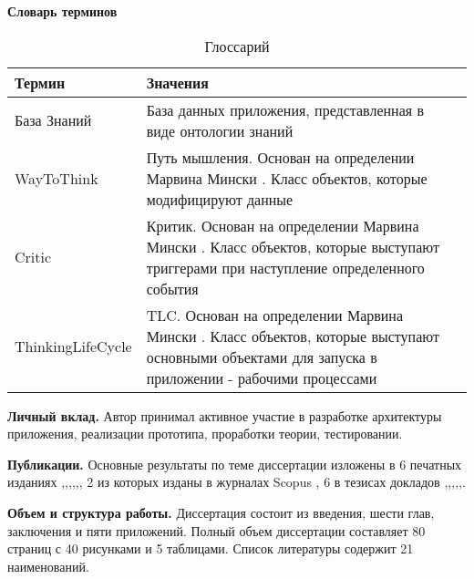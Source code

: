 \textbf{Словарь терминов}
\begin{table} [htbp]
   \centering
   \parbox{15cm}{\caption{Глоссарий}\label{Glossary}}
  \begin{tabular}{| p{5cm} ||p{5cm}|| p{5cm} |}
  \hline
  \hline
Термин & Значения \\
  \hline
  \hline
База Знаний	& База данных приложения, представленная в виде онтологии знаний \\
 \hline
WayToThink	& Путь мышления. Основан на определении Марвина Мински \cite{EmotionMachine}. Класс объектов, которые модифицируют данные \\
 \hline
Critic	& Критик. Основан на определении Марвина Мински \cite{EmotionMachine}. Класс объектов, которые выступают триггерами при наступление определенного события \\
 \hline
ThinkingLifeCycle	& TLC. Основан на определении Марвина Мински \cite{EmotionMachine}. Класс объектов, которые выступают основными объектами для запуска в приложении - рабочими процессами \\

 \hline
  \hline
\end{tabular}
\end{table}

\textbf{Личный вклад.} Автор принимал активное участие в разработке архитектуры приложения, реализации прототипа, проработки теории, тестировании.

\textbf{Публикации.} Основные результаты по теме диссертации изложены в 6 печатных изданиях  \cite{Lobachevskii},\cite{WCIT-2012},\cite{RCDL-2014},\cite{AINL-2013},\cite{ISGZ},\cite{AMSTA-2015}, 
2 из которых изданы в журналах Scopus 
\cite{RCDL-2014}, \cite{AMSTA-2015} 
6 в тезисах докладов \cite{Lobachevskii},\cite{WCIT-2012},\cite{RCDL-2014},\cite{AINL-2013},\cite{ISGZ},\cite{AMSTA-2015}.

\textbf{Объем и структура работы.} Диссертация состоит из введения, шести глав, заключения и пяти приложений. Полный объем диссертации составляет 80 страниц с 40 рисунками и 5 таблицами. Список литературы содержит 21 наименований.


\clearpage